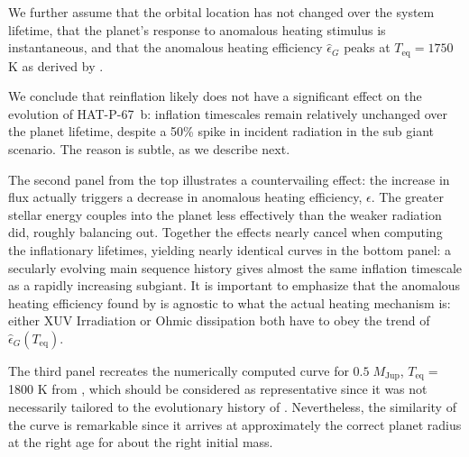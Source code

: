\documentclass[twocolumn]{aastex631}
\newcommand{\hatpb}{\object{HAT-P-67 b}}
\begin{document}
We further assume that the orbital location has not changed over the system lifetime, that the planet's response to anomalous heating stimulus is instantaneous, and that the anomalous heating efficiency $\hat{\epsilon}_G$ peaks at $T_\mathrm{eq}=1750$ K as derived by \citet{2018AJ....155..214T}.

We conclude that reinflation likely does not have a significant effect on the evolution of HAT-P-67~b: inflation timescales remain relatively unchanged over the planet lifetime, despite a 50\% spike in incident radiation in the sub giant scenario.  The reason is subtle, as we describe next.  

The second panel from the top illustrates a countervailing effect: the increase in flux actually triggers a decrease in anomalous heating efficiency, $\epsilon$. The greater stellar energy couples into the planet less effectively than the weaker radiation did, roughly balancing out. Together the effects nearly cancel when computing the inflationary lifetimes, yielding nearly identical curves in the bottom panel: a secularly evolving main sequence history gives almost the same inflation timescale as a rapidly increasing subgiant.  It is important to emphasize that the anomalous heating efficiency found by \citet{2018AJ....155..214T} is agnostic to what the actual heating mechanism is: either XUV Irradiation or Ohmic dissipation both have to obey the trend of $\hat{\epsilon}_G(T_\mathrm{eq})$.

The third panel recreates the numerically computed curve for $0.5\;M_\mathrm{Jup}$, $T_\mathrm{eq}=$1800 K from \citep{2011ApJ...738....1B}, which should be considered as representative since it was not necessarily tailored to the evolutionary history of \hatpb.  Nevertheless, the similarity of the curve is remarkable since it arrives at approximately the correct planet radius at the right age for about the right initial mass.
\end{document}
